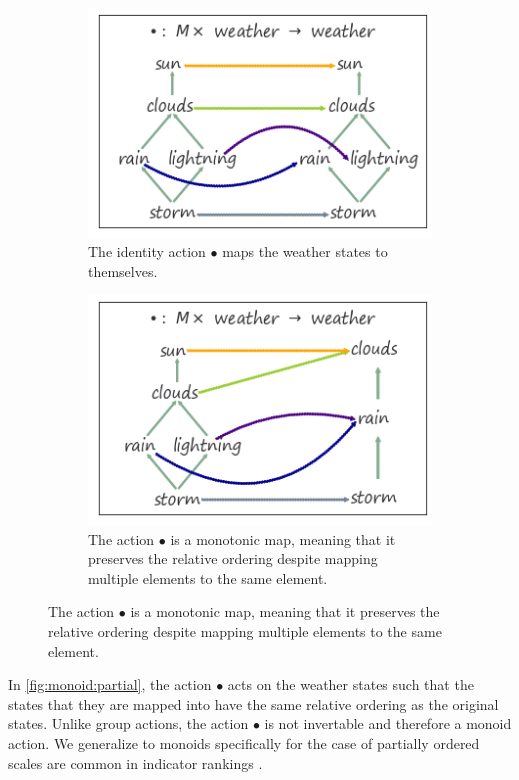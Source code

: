 \documentclass[../main.tex]{subfiles}
\begin{document}
\begin{figure}[H]
\begin{subfigure}{.5\textwidth}
    \includegraphics[width=\textwidth]{figures/math/monoid_total.png}
    \caption{The identity action $\bullet$ maps the weather states to themselves.}
    \label{fig:monoid:total}
\end{subfigure}
\begin{subfigure}{.5\textwidth}
    \includegraphics[width=1\textwidth]{figures/math/monoid_partial.png}
    \caption{The action $\bullet$ is a monotonic map, meaning that it preserves the relative ordering despite mapping multiple elements to the same element.}
    \label{fig:monoid:partial}
\end{subfigure}
\end{figure}
 In \autoref{fig:monoid:partial}, the action $\bullet$ acts on the weather states such that the states that they are mapped into have the same relative ordering as the original states. Unlike group actions, the action $\bullet$ is not invertable and therefore a monoid action. We generalize to monoids specifically for the case of partially ordered scales are common in indicator rankings \cite{bruggemannRankingPrioritizationMultiindicator2011}.
\end{document}
